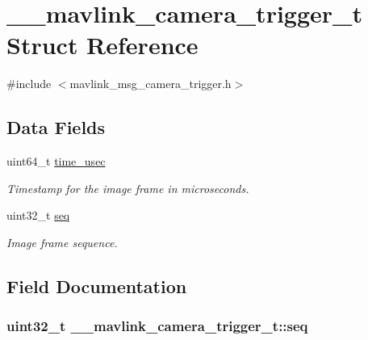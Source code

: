 \hypertarget{struct____mavlink__camera__trigger__t}{\section{\+\_\+\+\_\+mavlink\+\_\+camera\+\_\+trigger\+\_\+t Struct Reference}
\label{struct____mavlink__camera__trigger__t}
}


{\ttfamily \#include $<$mavlink\+\_\+msg\+\_\+camera\+\_\+trigger.\+h$>$}

\subsection*{Data Fields}
\begin{DoxyCompactItemize}
\item 
uint64\+\_\+t \hyperlink{struct____mavlink__camera__trigger__t_aaf4f6693470c617e50f516d2f2233c87}{time\+\_\+usec}
\begin{DoxyCompactList}\small\item\em Timestamp for the image frame in microseconds. \end{DoxyCompactList}\item 
uint32\+\_\+t \hyperlink{struct____mavlink__camera__trigger__t_a8ae7ad15d5e23c03c5c1592d33df1a85}{seq}
\begin{DoxyCompactList}\small\item\em Image frame sequence. \end{DoxyCompactList}\end{DoxyCompactItemize}


\subsection{Field Documentation}
\hypertarget{struct____mavlink__camera__trigger__t_a8ae7ad15d5e23c03c5c1592d33df1a85}{
\subsubsection[{seq}]{\setlength{\rightskip}{0pt plus 5cm}uint32\+\_\+t \+\_\+\+\_\+mavlink\+\_\+camera\+\_\+trigger\+\_\+t\+::seq}}\label{struct____mavlink__camera__trigger__t_a8ae7ad15d5e23c03c5c1592d33df1a85}


